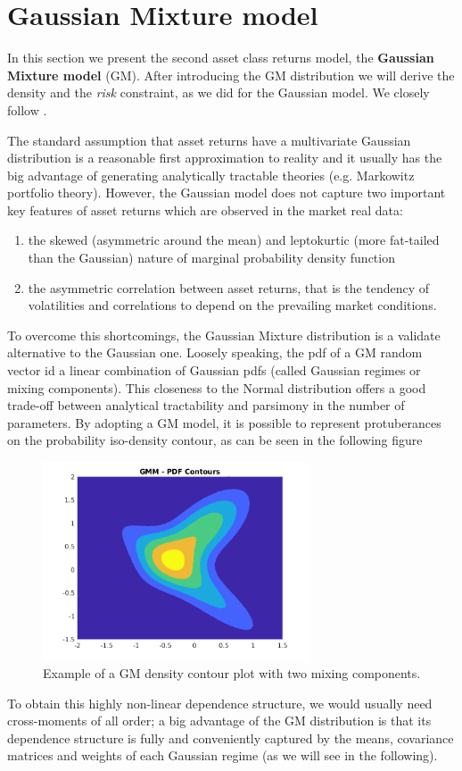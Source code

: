 \section{Gaussian Mixture model}
In this section we present the second asset class returns model, the \textbf{Gaussian Mixture model} (GM). After introducing the GM distribution we will derive the density and the \textit{risk} constraint, as we did for the Gaussian model. We closely follow \cite{BUCKLEY2008}.

The standard assumption that asset returns have a multivariate Gaussian distribution is a reasonable first approximation to reality and it usually has the big advantage of generating analytically tractable theories (e.g. Markowitz portfolio theory). However, the Gaussian model does not capture two important key features of asset returns which are observed in the market real data:
\begin{enumerate}
	\item the skewed (asymmetric around the mean) and leptokurtic (more fat-tailed than the Gaussian) nature of marginal probability density function
	\item the asymmetric correlation between asset returns, that is the tendency of volatilities and correlations to depend on the prevailing market conditions.
\end{enumerate}
To overcome this shortcomings, the Gaussian Mixture distribution is a validate alternative to the Gaussian one. Loosely speaking, the pdf of a GM random vector id a linear combination of Gaussian pdfs (called Gaussian regimes or mixing components). This closeness to the Normal distribution offers a good trade-off between analytical tractability and parsimony in the number of parameters. By adopting a GM model, it is possible to represent protuberances on the probability iso-density contour, as can be seen in the following figure
\begin{figure}[H]
	\caption{Example of a GM density contour plot with two mixing components.}
	\centering
	\includegraphics[width=0.7\textwidth]{Images/GMdensity.png}
\end{figure}
To obtain this highly non-linear dependence structure, we would usually need cross-moments of all order; a big advantage of the GM distribution is that its dependence structure is fully and conveniently captured by the means, covariance matrices and weights of each Gaussian regime (as we will see in the following).

